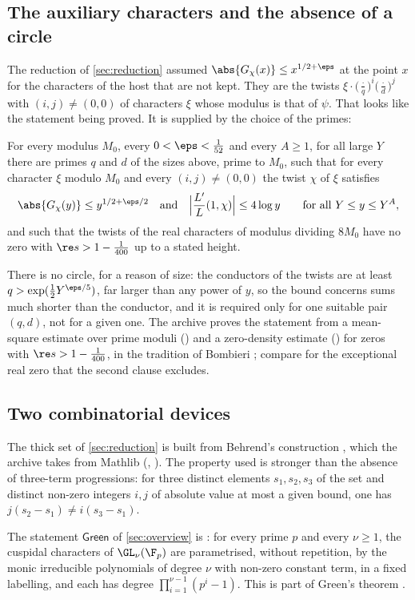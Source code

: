 \subsection{The auxiliary characters and the absence of a circle}
The reduction of \cref{sec:reduction} assumed $\abs{G_\chi(x)}\le x^{1/2+\eps}$ at the point
$x$ for the characters of the host that are not kept. They are the twists
$\xi\cdot\bigl(\tfrac\cdot q\bigr)^i\bigl(\tfrac\cdot d\bigr)^j$ with $(i,j)\ne(0,0)$ of
characters $\xi$ whose modulus is that of $\psi$. That looks like the statement being proved.
It is supplied by the choice of the primes:
\begin{statement}\label{st:pairs}
For every modulus $M_0$, every $0<\eps<\tfrac1{52}$ and every $A\ge1$, for all large $Y$ there
are primes $q$ and $d$ of the sizes above, prime to $M_0$, such that for every character $\xi$
modulo $M_0$ and every $(i,j)\neq(0,0)$ the twist $\chi$ of $\xi$ satisfies
\[
\abs{G_\chi(y)}\le y^{1/2+\eps/2}\quad\text{and}\quad
\Bigl|\frac{L'}{L}(1,\chi)\Bigr|\le4\log y\qquad\text{for all } Y\le y\le Y^{A},
\]
and such that the twists of the real characters of modulus dividing $8M_0$ have no zero with
$\re s>1-\tfrac1{400}$ up to a stated height.
\end{statement}
There is no circle, for a reason of size: the conductors of the twists are at least
$q>\exp(\tfrac12Y^{\eps/5})$, far larger than any power of $y$, so the bound concerns sums much
shorter than the conductor, and it is required only for one suitable pair $(q,d)$, not for a
given one. The archive proves the statement from a mean-square estimate over prime moduli
\lvS{} () and a zero-density estimate \lvS{} () for zeros
with $\re s>1-\tfrac1{400}$, in the tradition of Bombieri \cite{bombieri1965}; compare
\cite{siegel1935,page1935} for the exceptional real zero that the second clause excludes.

\subsection{Two combinatorial devices}
The thick set of \cref{sec:reduction} is built from Behrend's construction
\cite{behrend1946}, which the archive takes from Mathlib \lvS{} (,
). The property used is stronger than the absence of three-term
progressions: for three distinct elements $s_1,s_2,s_3$ of the set and distinct non-zero
integers $i,j$ of absolute value at most a given bound, one has $j(s_2-s_1)\ne i(s_3-s_1)$.

The statement $\mathsf{Green}$ of \cref{sec:overview} is \lvS: for every prime $p$ and every
$\nu\ge1$, the cuspidal characters of $\GL_\nu(\F_p)$ are parametrised, without repetition, by the
monic irreducible polynomials of degree $\nu$ with non-zero constant term, in a fixed labelling,
and each has degree $\prod_{i=1}^{\nu-1}(p^i-1)$. This is part of Green's theorem
\cite{green1955}.
